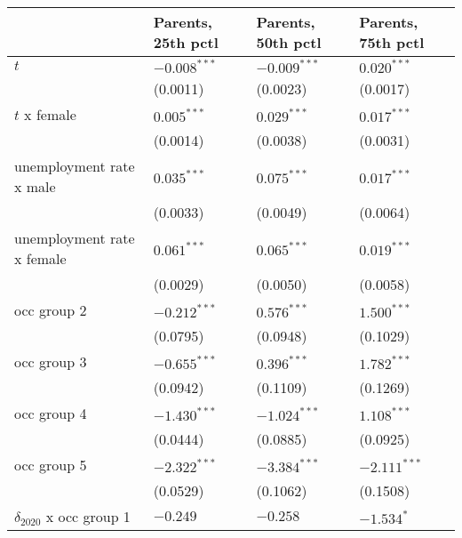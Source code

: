 \begin{tabular}{llll}
\toprule
{} & Parents, 25th pctl & Parents, 50th pctl & Parents, 75th pctl \\
\midrule
$t$                                    &     $-0.008^{***}$ &     $-0.009^{***}$ &      $0.020^{***}$ \\
                                       &           (0.0011) &           (0.0023) &           (0.0017) \\
$t$ x female                           &      $0.005^{***}$ &      $0.029^{***}$ &      $0.017^{***}$ \\
                                       &           (0.0014) &           (0.0038) &           (0.0031) \\
unemployment rate x male               &      $0.035^{***}$ &      $0.075^{***}$ &      $0.017^{***}$ \\
                                       &           (0.0033) &           (0.0049) &           (0.0064) \\
unemployment rate x female             &      $0.061^{***}$ &      $0.065^{***}$ &      $0.019^{***}$ \\
                                       &           (0.0029) &           (0.0050) &           (0.0058) \\
occ group 2                            &     $-0.212^{***}$ &      $0.576^{***}$ &      $1.500^{***}$ \\
                                       &           (0.0795) &           (0.0948) &           (0.1029) \\
occ group 3                            &     $-0.655^{***}$ &      $0.396^{***}$ &      $1.782^{***}$ \\
                                       &           (0.0942) &           (0.1109) &           (0.1269) \\
occ group 4                            &     $-1.430^{***}$ &     $-1.024^{***}$ &      $1.108^{***}$ \\
                                       &           (0.0444) &           (0.0885) &           (0.0925) \\
occ group 5                            &     $-2.322^{***}$ &     $-3.384^{***}$ &     $-2.111^{***}$ \\
                                       &           (0.0529) &           (0.1062) &           (0.1508) \\
$\delta_{2020}$ x occ group 1          &           $-0.249$ &           $-0.258$ &         $-1.534^*$ \\

\end{tabular}
